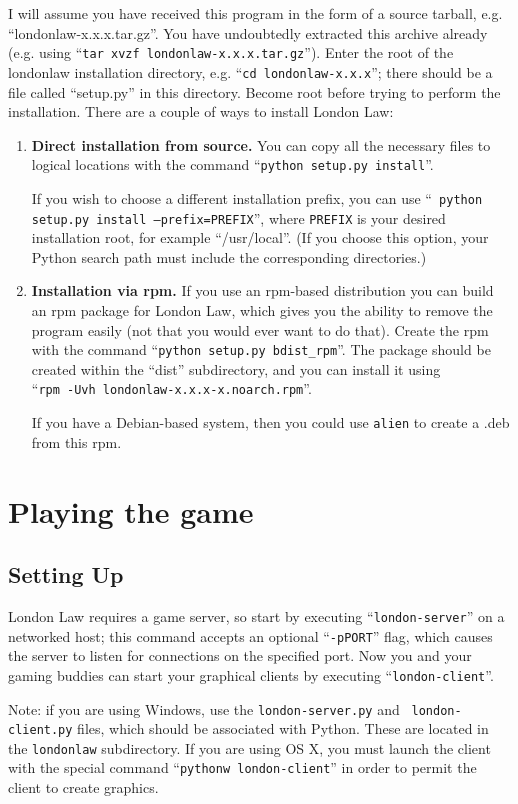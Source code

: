 \documentclass[11pt,notitlepage]{article}
\begin{document}
I will assume you have received this program in the form of a source tarball, 
e.g. ``londonlaw-x.x.x.tar.gz''.  You have undoubtedly extracted this archive 
already (e.g. using ``{\tt tar xvzf londonlaw-x.x.x.tar.gz}'').  Enter the root of 
the londonlaw installation directory, e.g. ``{\tt cd londonlaw-x.x.x}'';  there should 
be a file called ``setup.py'' in this directory.  Become root before 
trying to perform the installation.  There are a couple of ways to install London Law:
\begin{enumerate}
\item {\bf Direct installation from source.}  You can copy all the necessary 
files to logical locations with the command ``{\tt python setup.py install}''.  

If you wish to choose a different installation prefix, you can use ``{\tt 
python setup.py install --prefix=PREFIX}'', where {\tt PREFIX} is your desired
installation root, for example ``/usr/local''.  (If you choose this option, 
your Python search path must include the corresponding directories.)
\item {\bf Installation via rpm.}  If you use an rpm-based distribution you 
can build an rpm package for London Law, which gives you the ability to remove the 
program easily (not that you would ever want to do that).  Create the rpm with 
the command ``{\tt python setup.py bdist\_rpm}''.  The package should be created 
within the ``dist'' subdirectory, and you can install it using \\
``{\tt rpm -Uvh londonlaw-x.x.x-x.noarch.rpm}''.

If you have a Debian-based system, then you could use {\tt alien} to create a .deb 
from this rpm. 
\end{enumerate}


\section*{Playing the game}
\subsection*{Setting Up}
London Law requires a game server, so start by executing ``{\tt london-server}'' on
a networked host; this command accepts an optional ``{\tt -pPORT}'' flag, which
causes the server to listen for connections on the specified port.  Now you and your 
gaming buddies can start your graphical clients by executing ``{\tt london-client}''.

Note: if you are using Windows, use the {\tt london-server.py} and  {\tt
london-client.py} files, which should be associated with Python.  These are
located in the {\tt londonlaw} subdirectory.  If you are using OS X, you must
launch the client with the special command ``{\tt pythonw london-client}'' in order
to permit the client to create graphics.
\end{document}
